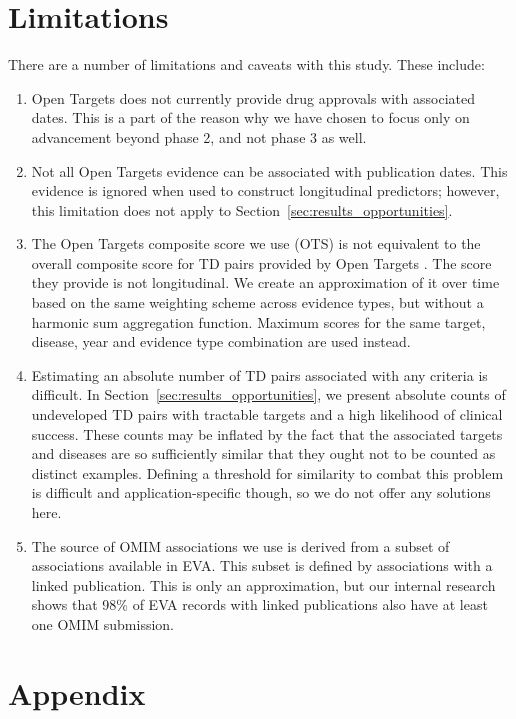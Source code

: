 \documentclass{article}
\begin{document}
\section{Limitations}

There are a number of limitations and caveats with this study. These include:

\begin{enumerate}
  \item Open Targets does not currently provide drug approvals with associated dates. This is a part of the reason why we have chosen to focus only on advancement beyond phase 2, and not phase 3 as well. 
  \item Not all Open Targets evidence can be associated with publication dates. This evidence is ignored when used to construct longitudinal predictors; however, this limitation does not apply to Section~\ref{sec:results_opportunities}.
  \item The Open Targets composite score we use (OTS) is not equivalent to the overall composite score for TD pairs provided by Open Targets \cite{OTscoring}. The score they provide is not longitudinal. We create an approximation of it over time based on the same weighting scheme across evidence types, but without a harmonic sum aggregation function. Maximum scores for the same target, disease, year and evidence type combination are used instead.
  \item Estimating an absolute number of TD pairs associated with any criteria is difficult. In Section~\ref{sec:results_opportunities}, we present absolute counts of undeveloped TD pairs with tractable targets and a high likelihood of clinical success. These counts may be inflated by the fact that the associated targets and diseases are so sufficiently similar that they ought not to be counted as distinct examples. Defining a threshold for similarity to combat this problem is difficult and application-specific though, so we do not offer any solutions here.
  \item The source of OMIM associations we use is derived from a subset of associations available in EVA. This subset is defined by associations with a linked publication. This is only an approximation, but our internal research shows that 98\% of EVA records with linked publications also have at least one OMIM submission.
\end{enumerate}

\pagebreak

\section{Appendix}
\end{document}

